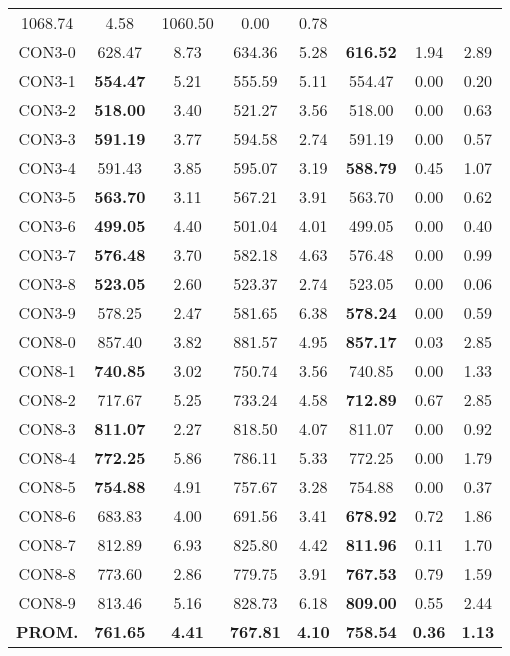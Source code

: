 \begin{table}[h]
\begin{tabular}{c c c c c c c c}
1068.74 & 4.58 & 1060.50 & 0.00
 & 0.78\\CON3-0 & 628.47 & 8.73 & 
634.36 & 5.28 & \bf{616.52} & 
1.94 & 2.89\\CON3-1 & \bf{554.47} & 5.21 & 
555.59 & 5.11 & 554.47 & 0.00
 & 0.20\\CON3-2 & \bf{518.00} & 3.40 & 
521.27 & 3.56 & 518.00 & 0.00
 & 0.63\\CON3-3 & \bf{591.19} & 3.77 & 
594.58 & 2.74 & 591.19 & 0.00
 & 0.57\\CON3-4 & 591.43 & 3.85 & 
595.07 & 3.19 & \bf{588.79} & 
0.45 & 1.07\\CON3-5 & \bf{563.70} & 3.11 & 
567.21 & 3.91 & 563.70 & 0.00
 & 0.62\\CON3-6 & \bf{499.05} & 4.40 & 
501.04 & 4.01 & 499.05 & 0.00
 & 0.40\\CON3-7 & \bf{576.48} & 3.70 & 
582.18 & 4.63 & 576.48 & 0.00
 & 0.99\\CON3-8 & \bf{523.05} & 2.60 & 
523.37 & 2.74 & 523.05 & 0.00
 & 0.06\\CON3-9 & 578.25 & 2.47 & 
581.65 & 6.38 & \bf{578.24} & 
0.00 & 0.59\\CON8-0 & 857.40 & 3.82 & 
881.57 & 4.95 & \bf{857.17} & 
0.03 & 2.85\\CON8-1 & \bf{740.85} & 3.02 & 
750.74 & 3.56 & 740.85 & 0.00
 & 1.33\\CON8-2 & 717.67 & 5.25 & 
733.24 & 4.58 & \bf{712.89} & 
0.67 & 2.85\\CON8-3 & \bf{811.07} & 2.27 & 
818.50 & 4.07 & 811.07 & 0.00
 & 0.92\\CON8-4 & \bf{772.25} & 5.86 & 
786.11 & 5.33 & 772.25 & 0.00
 & 1.79\\CON8-5 & \bf{754.88} & 4.91 & 
757.67 & 3.28 & 754.88 & 0.00
 & 0.37\\CON8-6 & 683.83 & 4.00 & 
691.56 & 3.41 & \bf{678.92} & 
0.72 & 1.86\\CON8-7 & 812.89 & 6.93 & 
825.80 & 4.42 & \bf{811.96} & 
0.11 & 1.70\\CON8-8 & 773.60 & 2.86 & 
779.75 & 3.91 & \bf{767.53} & 
0.79 & 1.59\\CON8-9 & 813.46 & 5.16 & 
828.73 & 6.18 & \bf{809.00} & 
0.55 & 2.44\\\bf{PROM.} & 
\bf{761.65} & \bf{4.41} & \bf{767.81} & \bf{4.10} & \bf{758.54} & \bf{0.36} & \bf{1.13}\\[1ex]\hline
\end{tabular}
\label{table:nonlin}
\end{table}

